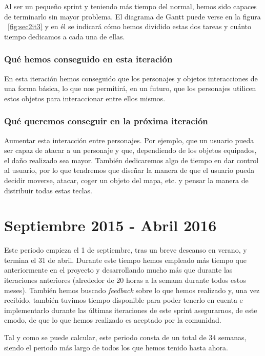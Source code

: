 Al ser un pequeño sprint y teniendo más tiempo del normal, hemos sido capaces de terminarlo sin mayor problema. El diagrama de Gantt puede verse en la figura ~\ref{fig:sec2it3} y en él se indicará cómo hemos dividido estas dos tareas y cuánto tiempo dedicamos a cada una de ellas.

\subsubsection{Qué hemos conseguido en esta iteración}

En esta iteración hemos conseguido que los personajes y objetos interacciones de una forma básica, lo que nos permitirá, en un futuro, que los personajes utilicen estos objetos para interaccionar entre ellos mismos.

\subsubsection{Qué queremos conseguir en la próxima iteración}

Aumentar esta interacción entre personajes. Por ejemplo, que un usuario pueda ser capaz de atacar a un personaje y que, dependiendo de los objetos equipados, el daño realizado sea mayor. 
También dedicaremos algo de tiempo en dar control al usuario, por lo que tendremos que diseñar la manera de que el usuario pueda decidir moverse, atacar, coger un objeto del mapa, etc. y pensar la manera de distribuir todas estas teclas.

\section{Septiembre 2015 - Abril 2016}

Este periodo empieza el 1 de septiembre, tras un breve descanso en verano, y termina el 31 de abril. Durante este tiempo hemos empleado más tiempo que anteriormente en el proyecto y desarrollando mucho más que durante las iteraciones anteriores (alrededor de 20 horas a la semana durante todos estos meses). También hemos buscado \textit{feedback} sobre lo que hemos realizado y, una vez recibido, también tuvimos tiempo disponible para poder tenerlo en cuenta e implementarlo durante las últimas iteraciones de este sprint asegurarnos, de este emodo, de que lo que hemos realizado es aceptado por la comunidad.

Tal y como se puede calcular, este periodo consta de un total de 34 semanas, siendo el periodo más largo de todos los que hemos tenido hasta ahora.

